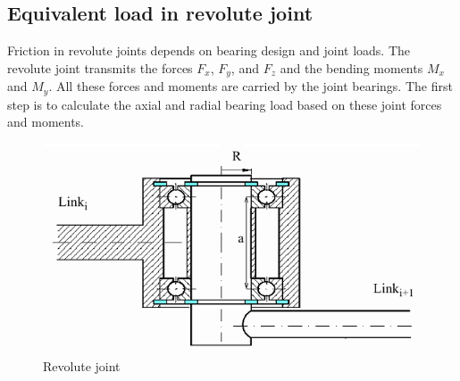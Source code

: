 \subsection{Equivalent load in revolute joint}
\label{subs:FricRevJoint}

Friction in revolute joints depends on bearing design and joint loads.
The revolute joint transmits the forces $F_x$, $F_y$, and $F_z$ and the bending
moments $M_x$ and $M_y$.
All these forces and moments are carried by the joint bearings.
The first step is to calculate the axial and radial bearing load based on these
joint forces and moments.

\begin{figure}[b]
\includegraphics[width=\textwidth]{Figures/FricRevJoint.png}
\caption{Revolute joint}
\label{figFric:RevJoint}
\end{figure}

